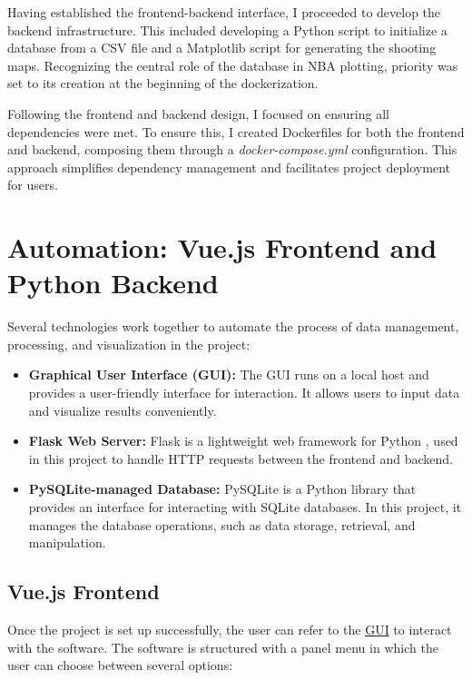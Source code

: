 \documentclass[sn-mathphys-num]{sn-jnl}%
\theoremstyle{thmstyleone}%
\theoremstyle{thmstyletwo}%
\theoremstyle{thmstylethree}%
\begin{document}
Having established the frontend-backend interface, I proceeded to develop the backend infrastructure. This included developing a Python script to initialize a database from a CSV file and a Matplotlib script for generating the shooting maps. Recognizing the central role of the database in NBA plotting, priority was set to its creation at the beginning of the dockerization.

Following the frontend and backend design, I focused on ensuring all dependencies were met. To ensure this, I created Dockerfiles for both the frontend and backend, composing them through a \textit{docker-compose.yml} configuration. This approach simplifies dependency management and facilitates project deployment for users.

\section{Automation: Vue.js Frontend and Python Backend}\label{sec3}

Several technologies work together to automate the process of data management, processing, and visualization in the project:

\begin{itemize}
    \item \textbf{Graphical User Interface (GUI):} The GUI runs on a local host and provides a user-friendly interface for interaction. It allows users to input data and visualize results conveniently.
    \item \textbf{Flask Web Server:} Flask is a lightweight web framework for Python \cite{flaskdocu}, used in this project to handle HTTP requests between the frontend and backend.
    \item \textbf{PySQLite-managed Database:} PySQLite is a Python library that provides an interface for interacting with SQLite databases. In this project, it manages the database operations, such as data storage, retrieval, and manipulation. \cite{pysqlitedocu}
\end{itemize}

\subsection{Vue.js Frontend}\label{subsec2}

Once the project is set up successfully, the user can refer to the \href{http://localhost:8080}{GUI} to interact with the software. The software is structured with a panel menu in which the user can choose between several options:
\end{document}
